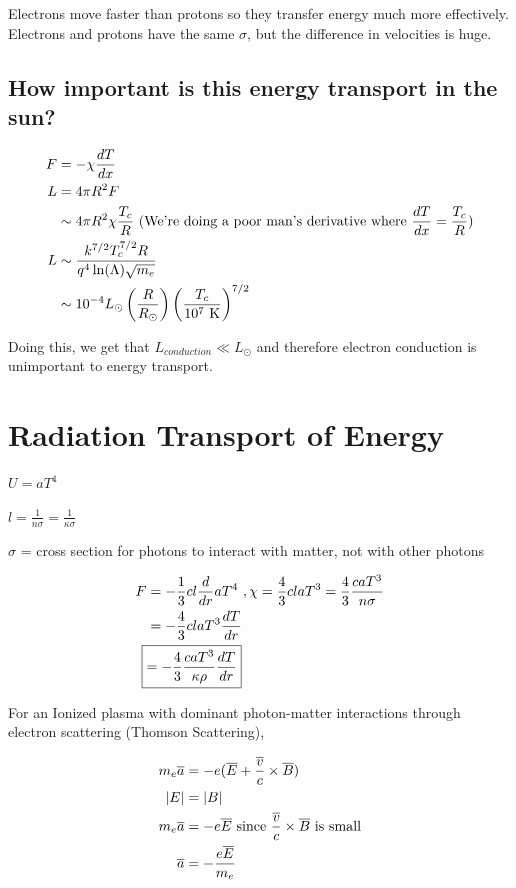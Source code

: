 Electrons move faster than protons so they transfer energy much more effectively. Electrons and protons have the same $\sigma$, but the difference in velocities is huge.

\subsection{How important is this energy transport in the sun?}

\begin{align}
F &= -\chi \frac{dT}{dx}\\
L &= 4 \pi R^2 F\\
&\sim 4 \pi R^2 \chi \frac{T_c}{R}~\text{(We're doing a poor man's derivative where $\frac{dT}{dx} = \frac{T_c}{R}$)}\\
L &\sim \frac{k^{7/2} T_c^{7/2} R}{q^4 \ln (\Lambda) \sqrt{m_e}}\\
&\sim 10^{-4} L_\odot \left( \frac{R}{R_\odot} \right) \left( \frac{T_c}{10^7\text{ K} } \right)^{7/2}
\end{align}

Doing this, we get that $L_{conduction} \ll L_\odot$ and therefore electron conduction is unimportant to energy transport. 

\section{Radiation Transport of Energy}
\begin{list}{}{}
\item $U = aT^4$
\item $l = \frac{1}{n \sigma} = \frac{1}{\kappa \sigma}$
\item $\sigma$ = cross section for photons to interact with matter, not with other photons
\end{list}

\begin{align}
F &=-\frac{1}{3}cl \frac{d}{dr}aT^4~,\chi = \frac{4}{3}claT^3 = \frac{4}{3}\frac{caT^3}{n\sigma} \\
&= -\frac{4}{3}claT^3 \frac{dT}{dr}\\
\Aboxed{&=-\frac{4}{3}\frac{caT^3}{\kappa \rho} \frac{dT}{dr}}
\end{align}

For an Ionized plasma with dominant photon-matter interactions through electron scattering (Thomson Scattering),

\begin{align}
m_e \overline{a} &= -e(\overline{E} + \frac{\overline{v}}{c} \times \overline{B})\\
|E| &= |B|\\
m_e\overline{a} &= -e\overline{E}\text{ since $ \frac{\overline{v}}{c} \times \overline{B}$ is small}\\
\overline{a} &= -\frac{e \overline{E}}{m_e}
\end{align}

